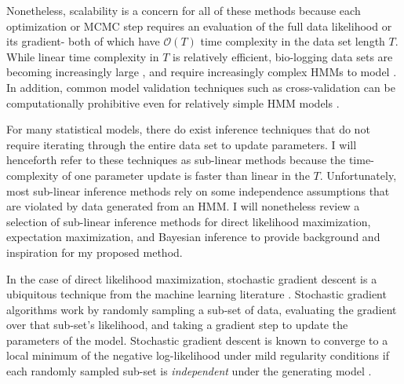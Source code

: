 Nonetheless, scalability is a concern for all of these methods because each optimization or MCMC step requires an evaluation of the full data likelihood or its gradient- both of which have $\mathcal{O}(T)$ time complexity in the data set length $T$. While linear time complexity in $T$ is relatively efficient, bio-logging data sets are becoming increasingly large \citep{Patterson:2017}, and require increasingly complex HMMs to model \citep{Adam:2019}. In addition, common model validation techniques such as cross-validation can be computationally prohibitive even for relatively simple HMM models \citep{Pohle:2017}.


For many statistical models, there do exist inference techniques that do not require iterating through the entire data set to update parameters. I will henceforth refer to these techniques as sub-linear methods because the time-complexity of one parameter update is faster than linear in the $T$. Unfortunately, most sub-linear inference methods rely on some independence assumptions that are violated by data generated from an HMM. 
I will nonetheless review a selection of sub-linear inference methods for direct likelihood maximization, expectation maximization, and Bayesian inference to provide background and inspiration for my proposed method.

In the case of direct likelihood maximization, stochastic gradient descent is a ubiquitous technique from the machine learning literature \citep{Robbins:1951, Johnson:2013, Defazio:2014, Kingma:2014}. Stochastic gradient algorithms work by randomly sampling a sub-set of data, evaluating the gradient over that sub-set's likelihood, and taking a gradient step to update the parameters of the model. Stochastic gradient descent is known to converge to a local minimum of the negative log-likelihood under mild regularity conditions if each randomly sampled sub-set is \textit{independent} under the generating model \citep{Robbins:1951}.

